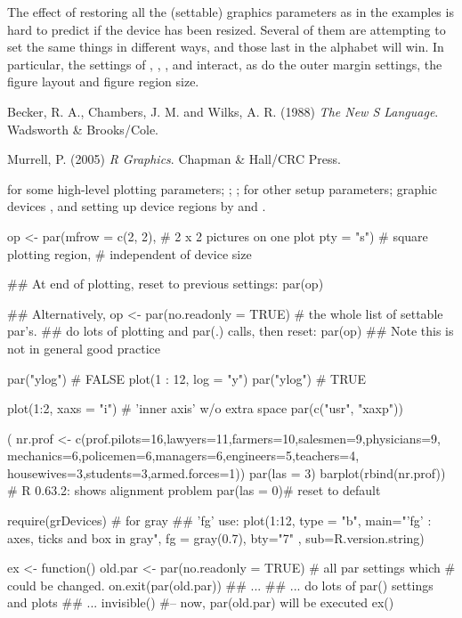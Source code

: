 %
\begin{Note}\relax
The effect of restoring all the (settable) graphics parameters as
in the examples is hard to predict if the device has been resized.
Several of them are attempting to set the same things in different
ways, and those last in the alphabet will win.  In particular, the
settings of , , ,  and
 interact, as do the outer margin settings, the figure
layout and figure region size.
\end{Note}
%
\begin{References}\relax
Becker, R. A., Chambers, J. M. and Wilks, A. R. (1988)
\emph{The New S Language}.
Wadsworth \& Brooks/Cole.

Murrell, P. (2005) \emph{R Graphics}. Chapman \& Hall/CRC Press.
\end{References}
%
\begin{SeeAlso}\relax
{} for some high-level plotting parameters;
; ;
 for other setup parameters;
graphic devices ,  and
setting up device regions by  and
.
\end{SeeAlso}
%
\begin{Examples}
\begin{ExampleCode}
op <- par(mfrow = c(2, 2), # 2 x 2 pictures on one plot
          pty = "s")       # square plotting region,
                           # independent of device size

## At end of plotting, reset to previous settings:
par(op)

## Alternatively,
op <- par(no.readonly = TRUE) # the whole list of settable par's.
## do lots of plotting and par(.) calls, then reset:
par(op)
## Note this is not in general good practice

par("ylog") # FALSE
plot(1 : 12, log = "y")
par("ylog") # TRUE

plot(1:2, xaxs = "i") # 'inner axis' w/o extra space
par(c("usr", "xaxp"))

( nr.prof <-
  c(prof.pilots=16,lawyers=11,farmers=10,salesmen=9,physicians=9,
    mechanics=6,policemen=6,managers=6,engineers=5,teachers=4,
    housewives=3,students=3,armed.forces=1))
par(las = 3)
barplot(rbind(nr.prof)) # R 0.63.2: shows alignment problem
par(las = 0)# reset to default

require(grDevices) # for gray
## 'fg' use:
plot(1:12, type = "b", main="'fg' : axes, ticks and box in gray",
     fg = gray(0.7), bty="7" , sub=R.version.string)

ex <- function() {
   old.par <- par(no.readonly = TRUE) # all par settings which
                                      # could be changed.
   on.exit(par(old.par))
   ## ...
   ## ... do lots of par() settings and plots
   ## ...
   invisible() #-- now,  par(old.par)  will be executed
}
ex()
\end{ExampleCode}
\end{Examples}

